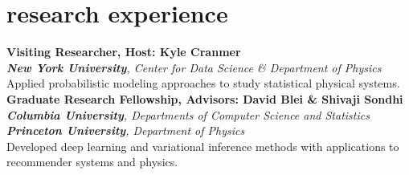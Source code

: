 \documentclass[4pt, letterpaper]{article}
\begin{document}
\section*{research experience}
\noindent
{}\textbf{Visiting Researcher, Host: {Kyle Cranmer}}\\
\emph{\textbf{New York University}, Center for Data Science \& Department of Physics}\\
Applied probabilistic modeling approaches to study statistical physical systems.\\
\textbf{Graduate Research Fellowship, Advisors: {David Blei} \& {Shivaji Sondhi}}\\
\emph{\textbf{Columbia University}, Departments of Computer Science and Statistics}\\
\emph{\textbf{Princeton University}, Department of Physics}\\
Developed deep learning and variational inference methods with applications to recommender systems and physics.\\
\end{document}
